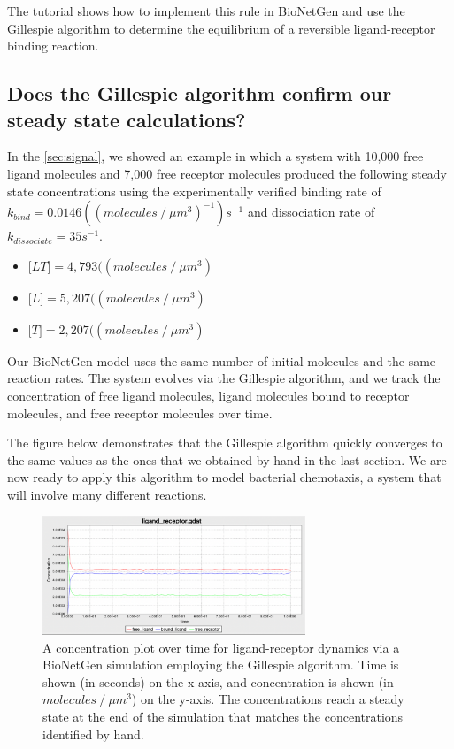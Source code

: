 The tutorial  shows how to implement this rule in BioNetGen and use the Gillespie algorithm to determine the equilibrium of a reversible ligand-receptor binding reaction.


\FloatBarrier
{}
\subsection{Does the Gillespie algorithm confirm our steady state calculations?}

In the \autoref{sec:signal}, we showed an example in which a system with 10,000 free ligand molecules and 7,000 free receptor molecules produced the following steady state concentrations using the experimentally verified binding rate of $k_{bind} = 0.0146 ((molecules\mathbin{/}\mu m^3)^{-1})s^{-1}$ and dissociation rate of $k_{dissociate} = 35s^{-1}$.

\begin{itemize}
\item $\text{[}LT\text{]} = 4,793 ((molecules\mathbin{/}\mu m^3)$
\item $\text{[}L\text{]} = 5,207 ((molecules\mathbin{/}\mu m^3)$
\item $\text{[}T\text{]} = 2,207 ((molecules\mathbin{/}\mu m^3)$
\end{itemize}

Our BioNetGen model uses the same number of initial molecules and the same reaction rates. The system evolves via the Gillespie algorithm, and we track the concentration of free ligand molecules, ligand molecules bound to receptor molecules, and free receptor molecules over time.

The figure below demonstrates that the Gillespie algorithm quickly converges to the same values as the ones that we obtained by hand in the last section. We are now ready to apply this algorithm to model bacterial chemotaxis, a system that will involve many different reactions.

\begin{figure}[h]
\centering
\mySfFamily
\includegraphics[width = 0.7\textwidth]{../images/chemotaxis_tutorial4_ssa.png}
\caption{A concentration plot over time for ligand-receptor dynamics via a BioNetGen simulation employing the Gillespie algorithm. Time is shown (in seconds) on the x-axis, and concentration is shown (in $molecules\mathbin{/}\mu m^3$) on the y-axis. The concentrations reach a steady state at the end of the simulation that matches the concentrations identified by hand.}
\label{fig:chemotaxis_tutorial4_ssa}
\end{figure}

